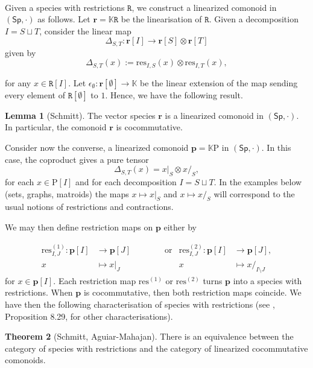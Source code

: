 \documentclass[12pt, reqno]{amsart}
\theoremstyle{definition}
\newtheorem{thm}{Theorem}[section]
\newtheorem{lm}[thm]{Lemma}
\newcommand{\Ss}{\mathsf{Sp}} %
\newcommand{\rP}{\mathrm{P}}
\newcommand{\prR}{\mathtt{R}}
\newcommand{\tp}{\mathbf{p}}
\newcommand{\trr}{\mathbf{r}}
\begin{document}
\

Given a species with restrictions $\prR$, we construct a linearized comonoid in $(\Ss, \cdot)$ as follows. Let $\trr=\mathbb{K}\prR$ be the linearisation of $\prR$. Given a decomposition $I=S \sqcup T$, consider the linear map
\[
\Delta_{S,T}: \trr[I]\to \trr[S] \otimes \trr[T]
\]
given by
\begin{equation}\label{CoprodRestr}
\Delta_{S,T}(x):=\text{res}_{I,S}(x)\otimes \text{res}_{I,T}(x),
\end{equation}

for any $x \in \prR[I]$. Let $\epsilon_\emptyset: \trr[\emptyset]\to \mathbb{K}$ be the linear extension of the map sending every element of $\prR[\emptyset]$ to $1$. Hence, we have the following result.

\begin{lm}[Schmitt]
The vector species $\trr$ is a linearized comonoid in $(\Ss, \cdot)$. In particular, the comonoid $\trr$ is cocommutative.
\end{lm}


Consider now the converse, a linearized comonoid $\tp=\mathbb{K}\rP$ in $(\Ss, \cdot)$.
In this case, the coproduct gives a pure tensor
\[\Delta_{S,T}(x)=x|_S \otimes x/_S,\]
for each $x \in \rP[I]$ and for each decomposition $I = S \sqcup T$. In the examples below (sets, graphs, matroids) the maps $x \mapsto x|_S$ and $x \mapsto x/_S$ will correspond to the usual notions of restrictions and contractions.

We may then define restriction maps on $\tp$ either by

\begin{align*}
\text{res}^{(1)}_{I,J}: \tp[I] &\to \tp[J] \qquad \qquad  \text{or}  &\text{res}^{(2)}_{I,J}: \tp[I] &\to \tp[J],\\
x&\mapsto x|_J \qquad &x&\mapsto x/_{I\setminus J}
\end{align*} 
for $x \in \tp[I]$. Each restriction map $\text{res}^{(1)}$ or $\text{res}^{(2)}$ turns $\tp$ into a species with restrictions. When $\tp$ is cocommutative, then both restriction maps coincide. We have then the following characterisation of species with restrictions (see \cite{AM2010}, Proposition 8.29, for other characterisations).

\begin{thm}[Schmitt, Aguiar-Mahajan]\label{thm:swr_lcc}
There is an equivalence between the category of species with restrictions and the category of linearized cocommutative comonoids.
\end{thm}
\end{document}

